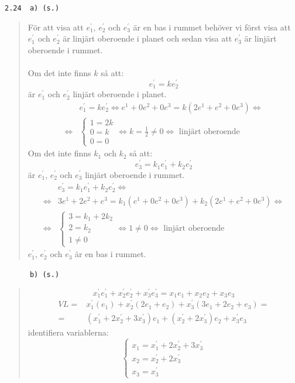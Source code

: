 \documentclass[a4paper]{article}
\newcommand{\tskcol}[1]{\textcolor{tskcol}{#1}}
\begin{document}
\pagebreak
\texttt{\tskcol{2.24~~a) (s.)}}
\begin{quotation}
	\noindent
	För att visa att $e^{'}_1$, $e^{'}_2$ och $e^{'}_3$ är en bas i rummet behöver vi först visa att  $e^{'}_1$ och $e^{'}_2$ är linjärt oberoende i planet och sedan visa att $e^{'}_3$ är linjärt oberoende i rummet.
	\\ \\
	Om det inte finns $k$ så att:
	\[e^{'}_1=ke^{'}_2\]
	är $e^{'}_1$ och $e^{'}_2$ linjärt oberoende i planet.
	\begin{align*}
	&e^{'}_1=ke^{'}_2 \Leftrightarrow
	e^1+0e^2+0e^3=k(2e^1+e^2+0e^3) \Leftrightarrow \\ \Leftrightarrow
	&\begin{cases}
	1=2k \\
	0=k \\
	0=0
	\end{cases} \Leftrightarrow
	k=\frac{1}{2}\neq0 \Leftrightarrow
	\text{ linjärt oberoende}
	\end{align*}
	Om det inte finns $k_1$ och $k_2$ så att:
	\[e^{'}_3=k_1e^{'}_1+k_2e^{'}_2\]
	är $e^{'}_1$, $e^{'}_2$ och $e^{'}_3$ linjärt oberoende i rummet.
	\begin{align*}
	&e^{'}_3=k_1e^{'}_1+k_2e^{'}_2 \Leftrightarrow \\ \Leftrightarrow
	&3e^1+2e^2+e^3=k_1(e^1+0e^2+0e^3)+k_2(2e^1+e^2+0e^3) \Leftrightarrow \\ \Leftrightarrow
	&\begin{cases}
	3=k_1+2k_2 \\
	2=k_2 \\
	1\neq0
	\end{cases} \Leftrightarrow
	1\neq0 \Leftrightarrow
	\text{ linjärt oberoende}
	\end{align*}
	$e^{'}_1$, $e^{'}_2$ och $e^{'}_3$ är en bas i rummet.
\end{quotation}

\texttt{\tskcol{~~~~~~b) (s.)}}
\begin{quotation}
	\noindent
	\[x^{'}_1e^{'}_1+x^{'}_2e^{'}_2+x^{'}_3e^{'}_3=x_1e_1+x_2e_2+x_3e_3\]
	\begin{align*}
	VL=&x^{'}_1(e_1)+x^{'}_2(2e_1+e_2)+x^{'}_3(3e_1+2e_2+e_3)= \\ =
	&(x^{'}_1+2x^{'}_2+3x^{'}_3)e_1+(x^{'}_2+2x^{'}_3)e_2+x^{'}_3e_3
	\end{align*}
	identifiera variablerna:
	\[\begin{cases}
	x_1=x^{'}_1+2x^{'}_2+3x^{'}_3 \\
	x_2=x^{'}_2+2x^{'}_3 \\
	x_3=x^{'}_3
	\end{cases}\]
\end{quotation}
\end{document}
